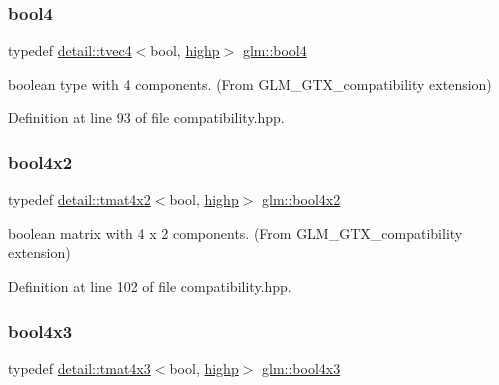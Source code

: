 \subsubsection{\texorpdfstring{bool4}{bool4}}
{\footnotesize\ttfamily typedef \hyperlink{structglm_1_1detail_1_1tvec4}{detail\+::tvec4}$<$bool, \hyperlink{namespaceglm_a0f04f086094c747d227af4425893f545ac6f7eab42eacbb10d59a58e95e362074}{highp}$>$ \hyperlink{group__gtx__compatibility_ga6ef1f104d22f384c4d59f2b1ca1768a7}{glm\+::bool4}}



boolean type with 4 components. (From G\+L\+M\+\_\+\+G\+T\+X\+\_\+compatibility extension) 



Definition at line 93 of file compatibility.\+hpp.

\mbox{\label{group__gtx__compatibility_gaa431c2e87e8d78c4780c938a9483d6ff}} 
\subsubsection{\texorpdfstring{bool4x2}{bool4x2}}
{\footnotesize\ttfamily typedef \hyperlink{structglm_1_1detail_1_1tmat4x2}{detail\+::tmat4x2}$<$bool, \hyperlink{namespaceglm_a0f04f086094c747d227af4425893f545ac6f7eab42eacbb10d59a58e95e362074}{highp}$>$ \hyperlink{group__gtx__compatibility_gaa431c2e87e8d78c4780c938a9483d6ff}{glm\+::bool4x2}}



boolean matrix with 4 x 2 components. (From G\+L\+M\+\_\+\+G\+T\+X\+\_\+compatibility extension) 



Definition at line 102 of file compatibility.\+hpp.

\mbox{\label{group__gtx__compatibility_ga7acb207ab877c53dc5751752e1f70053}} 
\subsubsection{\texorpdfstring{bool4x3}{bool4x3}}
{\footnotesize\ttfamily typedef \hyperlink{structglm_1_1detail_1_1tmat4x3}{detail\+::tmat4x3}$<$bool, \hyperlink{namespaceglm_a0f04f086094c747d227af4425893f545ac6f7eab42eacbb10d59a58e95e362074}{highp}$>$ \hyperlink{group__gtx__compatibility_ga7acb207ab877c53dc5751752e1f70053}{glm\+::bool4x3}}



